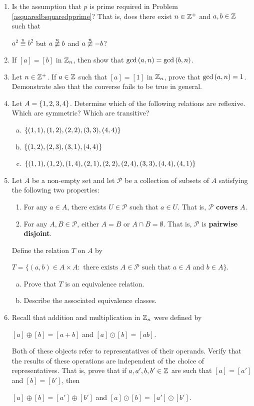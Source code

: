 \documentclass[11pt,fleqn,dvipsnames,usenames]{article}
\newcommand{\p}{\noindent}
\begin{document}
\begin{enumerate}
\item Is the assumption that $p$ is prime required in Problem \ref{asquaredbsquaredpprime}?  That is, does there exist $n\in\mathbb{Z}^{+}$ and $a,b\in\mathbb{Z}$ such that
\begin{center}
$a^2\overset{n}{\equiv}b^2$ but $a\not\overset{n}{\equiv}b$ and $a\not\overset{n}{\equiv}-b$?
\end{center}
\item If $[a] = [b]$ in $\mathbb{Z}_{n}$, then show that $\text{gcd}\left(a,n\right) = \text{gcd}\left(b,n\right)$.
\item Let $n\in\mathbb{Z}^{+}$.  If $a\in \mathbb{Z}$ such that $[a] = [1]$ in $\mathbb{Z}_{n}$, prove that $\text{gcd}\left(a,n\right) = 1$.  Demonstrate also that the converse fails to be true in general.
\item Let $A = \left\{1,2,3,4\right\}$.  Determine which of the following relations are reflexive.  Which are symmetric?  Which are transitive?
\begin{enumerate}[(a)]
\item $\left\{(1,1), (1,2), (2,2), (3,3), (4,4)\right\}$
\item $\left\{(1,2), (2,3), (3,1), (4,4)\right\}$
\item $\left\{(1,1), (1,2), (1,4), (2,1), (2,2), (2,4), (3,3), (4,4), (4,1)\right\}$
\end{enumerate}
\item Let $A$ be a non-empty set and let $\mathcal{P}$ be a collection of subsets of $A$ satisfying the following two properties:
\begin{enumerate}[(1)]
\item For any $a\in A$, there exists $U\in\mathcal{P}$ such that $a\in U$.  That is, $\mathcal{P}$ \textbf{covers} $A$.
\item For any $A,B\in\mathcal{P}$, either $A = B$ or $A\cap B = \emptyset$.  That is, $\mathcal{P}$ is \textbf{pairwise disjoint}.
\end{enumerate}
Define the relation $T$ on $A$ by
\begin{center}
$T = \big\{(a,b)\in A\times A:\text{ there exists }A\in\mathcal{P}\text{ such that }a\in A\text{ and }b\in A\big\}$.
\end{center}
\begin{enumerate}[(a)]
\item Prove that $T$ is an equivalence relation.
\item Describe the associated equivalence classes.
\end{enumerate}
\item Recall that addition and multiplication in $\mathbb{Z}_n$ were defined by
\begin{center}
$[a] \oplus [b] = [a + b]$ and $[a]\odot [b] = [ab]$.
\end{center}
\p Both of these objects refer to representatives of their operands.  Verify that the results of these operations are independent of the choice of representatives.  That is, prove that if $a,a',b,b'\in\mathbb{Z}$ are such that $[a] = [a']$ and $[b] = [b']$, then
\begin{center}
$[a]\oplus [b] = [a']\oplus [b']$ and $[a]\odot [b] = [a']\odot [b']$.
\end{center}


\end{enumerate}
\end{document}
